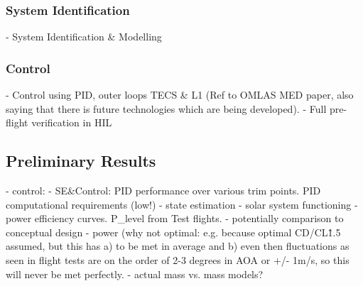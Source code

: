 \subsubsection{System Identification}
 - System Identification \& Modelling
 
 \subsubsection{Control}
 - Control using PID,  outer loops TECS \& L1 (Ref to OMLAS MED paper, also saying that there is future technologies which are being developed).
 - Full pre-flight verification in HIL
 
\subsection{Preliminary Results}
  - control:   - SE\&Control: PID performance over various trim points. PID computational requirements (low!)
  - state estimation
  - solar system functioning
   - power efficiency curves. P\_level from Test flights.
   - potentially comparison to conceptual design 
   	- power (why not optimal: e.g. because optimal CD/CL\^1.5 assumed, but this has a) to be met in average and b) even then fluctuations as seen in flight tests are on the order of 2-3 degrees in AOA or +/- 1m/s, so this will never be met perfectly.
   	- actual mass vs. mass models?
